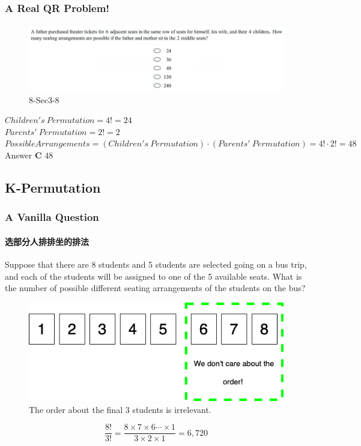 \documentclass[
	11pt, %
]{beamer}
\begin{document}
\begin{frame}
	\frametitle{A Real QR Problem!}
	\framesubtitle{}
	\begin{figure}
		\includegraphics[width=\linewidth]{K-Permutation_Example_Question.png}
		\caption{8-Sec3-8}
	\end{figure}
	\pause
$Children's\ Permutation= 4! =24$\\
$Parents'\ Permutation= 2! =2$\\
$Possible Arrangements= (Children's\ Permutation) \cdot (Parents'\ Permutation) =4! \cdot 2!=48$\\

\pause
\bigskip
Answer \textbf{C}  48
\end{frame}



\subsection{K-Permutation}

 
 \begin{frame}
	\frametitle{A Vanilla Question} %
	\framesubtitle{选部分人排排坐的排法}
	 Suppose that there are 8 students and 5 students are selected going on a bus trip, and each
of the students will be assigned to one of the 5 available seats. What is  the
number of possible different seating arrangements of the students on the
bus?

	\begin{figure}
		\includegraphics[width=0.5\linewidth]{K_permutation.png}
		\caption{The order about the final 3 students is irrelevant.}
	\end{figure}
	\begin{equation}
		\frac{8!}{3!} = \frac{8\times7\times6\cdots\times1}{3\times2\times1} = 6,720
	\end{equation}
\end{frame}
\end{document}
